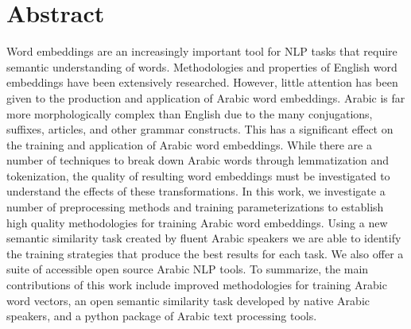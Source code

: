 \section*{Abstract}
\label{sec:abstract}

Word embeddings are an increasingly important tool for NLP tasks that require semantic understanding of words. Methodologies and properties of English word embeddings have been extensively researched. However, little attention has been given to the production and application of Arabic word embeddings. Arabic is far more morphologically complex than English due to the many conjugations, suffixes, articles, and other grammar constructs. This has a significant effect on the training and application of Arabic word embeddings. While there are a number of techniques to break down Arabic words through lemmatization and tokenization, the quality of resulting word embeddings must be investigated to understand the effects of these transformations. In this work, we investigate a number of preprocessing methods and training parameterizations to establish high quality methodologies for training Arabic word embeddings. Using a new semantic similarity task created by fluent Arabic speakers we are able to identify the training strategies that produce the best results for each task. We also offer a suite of accessible open source Arabic NLP tools. To summarize, the main contributions of this work include improved methodologies for training Arabic word vectors, an open semantic similarity task developed by native Arabic speakers, and a python package of Arabic text processing tools.